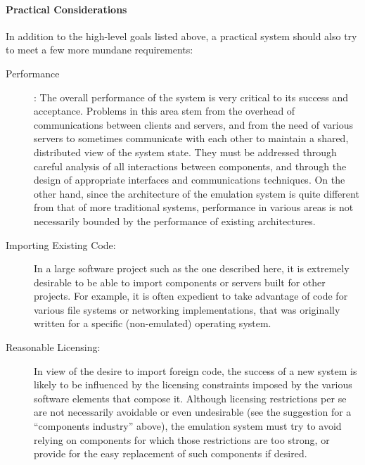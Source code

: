\paragraph{Practical Considerations}
In addition to the high-level goals listed above, a practical system
should also try to meet a few more mundane requirements:
\begin{description}

\item[Performance]: The overall performance of the system is very
critical to its success and acceptance. Problems in this area stem
from the overhead of communications between clients and servers, and
from the need of various servers to sometimes communicate with each
other to maintain a shared, distributed view of the system state. They
must be addressed through careful analysis of all interactions between
components, and through the design of appropriate interfaces and
communications techniques. On the other hand, since the architecture
of the emulation system is quite different from that of more
traditional systems, performance in various areas is not necessarily
bounded by the performance of existing architectures.

\item[Importing Existing Code:] In a large software project such as
the one described here, it is extremely desirable to be able to import
components or servers built for other projects. For example, it is
often expedient to take advantage of code for various file systems or
networking implementations, that was originally written for a specific
(non-emulated) operating system.


\item[Reasonable Licensing:] In view of the desire to import
foreign code, the success of a new system is likely to be influenced
by the licensing constraints imposed by the various software elements
that compose it. Although licensing restrictions per se are not
necessarily avoidable or even undesirable (see the suggestion for a
``components industry'' above), the emulation system must try to avoid
relying on components for which those restrictions are too strong, or
provide for the easy replacement of such components if desired.

\end{description}


